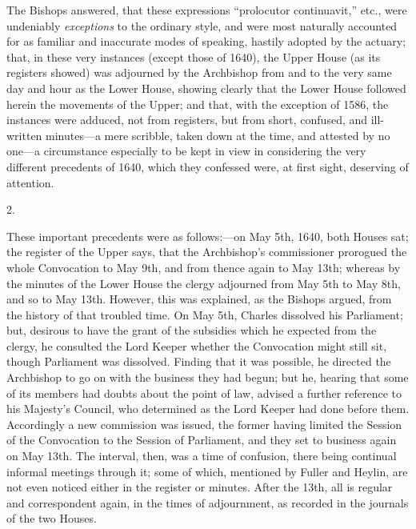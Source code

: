 The Bishops answered, that
these expressions ``prolocutor continuavit,'' etc., were undeniably \emph{exceptions}
to the ordinary style, and were most naturally accounted for as
familiar and inaccurate modes of speaking, hastily adopted by the
actuary; that, in these very instances (except those of 1640), the
Upper House (as its registers showed) was adjourned by the Archbishop
from and to the very same day and hour as the Lower House, showing
clearly that the Lower House followed herein the movements of the
Upper; and that, with the exception of 1586, the instances were
adduced, not from registers, but from short, confused, and ill-written
minutes—a mere scribble, taken down at the time, and attested by no
one—a circumstance especially to be kept in view in considering the
very different precedents of 1640, which they confessed were, at first
sight, deserving of attention.

2.

These important precedents
were as follows:—on May 5th, 1640, both Houses sat; the register of
the Upper says, that the Archbishop's commissioner prorogued the whole
Convocation to May 9th, and from thence again to May 13th; whereas by
the minutes of the Lower House the clergy adjourned from May 5th to
May 8th, and so to May 13th. However, this was explained, as the
Bishops argued, from the history of that troubled time. On May 5th,
Charles dissolved his Parliament; but, desirous to have the grant of
the subsidies which he expected from the clergy, he consulted the Lord
Keeper whether the Convocation might still sit, though
Parliament was dissolved. Finding that it was possible, he directed
the Archbishop to go on with the business they had begun; but he,
hearing that some of its members had doubts about the point of law,
advised a further reference to his Majesty's Council, who determined
as the Lord Keeper had done before them. Accordingly a new commission
was issued, the former having limited the Session of the Convocation
to the Session of Parliament, and they set to business again on May
13th. The interval, then, was a time of confusion, there being
continual informal meetings through it; some of which, mentioned by
Fuller and Heylin, are not even noticed either in the register or
minutes. After the 13th, all is regular and correspondent again, in
the times of adjournment, as recorded in the journals of the two
Houses.

